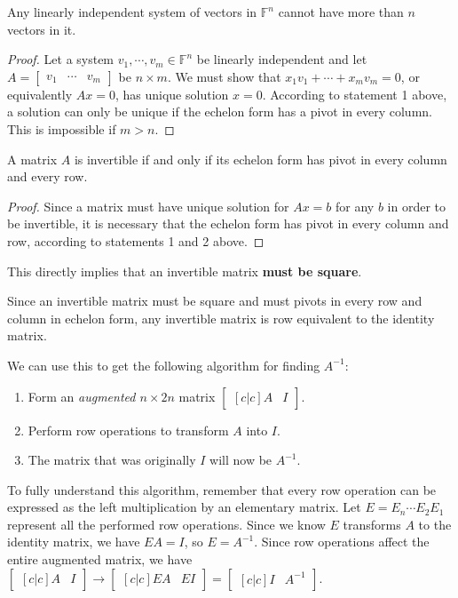 \begin{theorem}
Any linearly independent system of vectors in $\mathbb{F}^{n}$ cannot have more than $n$ vectors in it. 
\end{theorem}

\begin{proof}
Let a system $v_{1}, \cdots, v_{m} \in \mathbb{F}^{n}$ be linearly independent and let $A = \begin{bmatrix}
v_{1} & \cdots & v_{m}
\end{bmatrix}$ be $n \times m$. We must show that $x_{1} v_{1} + \cdots + x_{m} v_{m}= 0$, or equivalently $Ax = 0$, has unique solution $x = 0$. According to statement 1 above, a solution can only be unique if the echelon form has a pivot in every column. This is impossible if $m > n$.  
\end{proof}

\begin{theorem}
A matrix $A$ is invertible if and only if its echelon form has pivot in every column and every row. 
\end{theorem}

\begin{proof}
Since a matrix must have unique solution for $Ax = b$ for any $b$ in order to be invertible, it is necessary that the echelon form has pivot in every column and row, according to statements 1 and 2 above. 
\end{proof}
This directly implies that an invertible matrix \textbf{must be square}.

Since an invertible matrix must be square and must pivots in every row and column in echelon form, any invertible matrix is row equivalent to the identity matrix. 

We can use this to get the following algorithm for finding $A^{-1}$:
\begin{enumerate}
	\item Form an \textit{augmented $n \times 2n$} matrix 
	$\begin{bmatrix}[c|c] A & I\end{bmatrix}$.
	\item Perform row operations to transform $A$ into $I$.
	\item The matrix that was originally $I$ will now be $A^{-1}$.
\end{enumerate}

To fully understand this algorithm, remember that every row operation can be expressed as the left multiplication by an elementary matrix. Let $E = E_{n} \cdots E_{2} E_{1}$ represent all the performed row operations. Since we know $E$ transforms $A$ to the identity matrix, we have $EA = I$, so $E = A^{-1}$. Since row operations affect the entire augmented matrix, we have $\begin{bmatrix}[c|c]
A & I
\end{bmatrix} \rightarrow \begin{bmatrix}[c|c]
EA & EI
\end{bmatrix} = \begin{bmatrix}[c|c]
I & A^{-1}
\end{bmatrix}$. 

